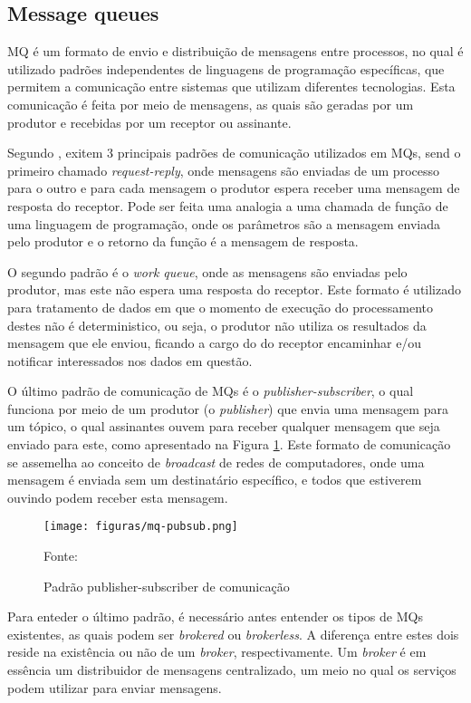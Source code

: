 \subsection{Message queues}

\ac{MQ} é um formato de envio e distribuição de mensagens entre processos,
no qual é utilizado padrões independentes de linguagens de programação
específicas, que permitem a comunicação entre sistemas que utilizam diferentes
tecnologias. Esta comunicação é feita por meio de mensagens, as quais são
geradas por um produtor e recebidas por um receptor ou assinante.

Segundo , exitem 3 principais padrões de comunicação
utilizados em \acp{MQ}, send o primeiro chamado \emph{request-reply}, onde
mensagens são enviadas de um processo para o outro e para cada mensagem o
produtor espera receber uma mensagem de resposta do receptor. Pode ser feita
uma analogia a uma chamada de função de uma linguagem de programação, onde os
parâmetros são a mensagem enviada pelo produtor e o retorno da função é a
mensagem de resposta.

O segundo padrão é o \emph{work queue}, onde as mensagens são enviadas pelo
produtor, mas este não espera uma resposta do receptor. Este formato é
utilizado para tratamento de dados em que o momento de execução do
processamento destes não é deterministico, ou seja, o produtor não utiliza
os resultados da mensagem que ele enviou, ficando a cargo do do receptor
encaminhar e/ou notificar interessados nos dados em questão.

O último padrão de comunicação de \acp{MQ} é o \emph{publisher-subscriber},
o qual funciona por meio de um produtor (o \emph{publisher}) que envia uma
mensagem para um tópico, o qual assinantes ouvem para receber qualquer
mensagem que seja enviado para este, como apresentado na Figura
\ref{fig:mq-pubsub}. Este formato de comunicação se assemelha ao conceito
de \emph{broadcast} de redes de computadores, onde uma mensagem é enviada
sem um destinatário específico, e todos que estiverem ouvindo podem receber
esta mensagem.

\begin{figure}[H]
	\centering
	\caption{Padrão publisher-subscriber de comunicação}
	\texttt{[image: figuras/mq-pubsub.png]}

	\label{fig:mq-pubsub}
	\footnotesize Fonte: 
\end{figure}

Para enteder o último padrão, é necessário antes entender os tipos de \acp{MQ}
existentes, as quais podem ser \emph{brokered} ou \emph{brokerless}.
A diferença entre estes dois reside na existência ou não de um \emph{broker},
respectivamente. Um \emph{broker} é em essência um distribuidor de mensagens
centralizado, um meio no qual os serviços podem utilizar para enviar mensagens.

